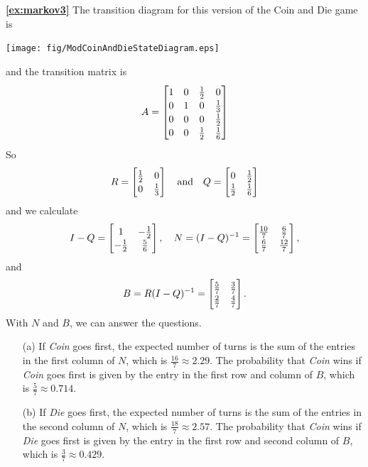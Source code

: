 \newpage
\textbf{\ref{ex:markov3}}
The transition diagram for this version of the Coin and Die game is

\medskip
\centerline{%
\texttt{[image: fig/ModCoinAndDieStateDiagram.eps]}
}
and the transition matrix is
\[
A = \begin{bmatrix}
        1  &  0  & \frac{1}{2} & 0 \T \B \\
	0  &  1  &   0         & \frac{1}{3} \B \\
	0  &  0  &   0         & \frac{1}{2} \B \\
	0  &  0  & \frac{1}{2} & \frac{1}{6} \B \\
    \end{bmatrix}
\]
So
\[
  R = \begin{bmatrix}
          \frac{1}{2} & 0 \T\B \\
	      0       & \frac{1}{3} \B 
      \end{bmatrix}
  \quad \textrm{and}\quad
  Q = \begin{bmatrix}
          0 & \frac{1}{2} \T\B \\
	  \frac{1}{2}    & \frac{1}{6} \B 
      \end{bmatrix}
\]
and we calculate
\[
I-Q = \begin{bmatrix}
          1 & -\frac{1}{2} \T\B \\
	  -\frac{1}{2}    & \frac{5}{6} \B 
      \end{bmatrix},
 \quad
N = (I-Q)^{-1} =
      \begin{bmatrix}
          \frac{10}{7} & \frac{6}{7} \T\B \\
	  \frac{6}{7}  & \frac{12}{7} \B 
      \end{bmatrix},
\]
and
\[
B = R(I-Q)^{-1} =
      \begin{bmatrix}
          \frac{5}{7} & \frac{3}{7} \T\B \\
	  \frac{2}{7}  & \frac{4}{7} \B 
      \end{bmatrix}.
\]
With $N$ and $B$, we can answer the questions.
\begin{enumerate}
\item[(a)] If \emph{Coin} goes first, the expected number
of turns is the sum of the entries in the first column
of $N$, which is $\frac{16}{7} \approx 2.29$.
The probability that \emph{Coin} wins if \emph{Coin}
goes first is given by the entry in the first
row and column of $B$, which is
$\frac{5}{7} \approx 0.714$.
\item[(b)] If \emph{Die} goes first, the expected number
of turns is the sum of the entries in the second column
of $N$, which is $\frac{18}{7} \approx 2.57$.
The probability that \emph{Coin} wins if \emph{Die}
goes first is given by the entry in the first
row and second column of $B$, which is
$\frac{3}{7} \approx 0.429$.
\end{enumerate}

